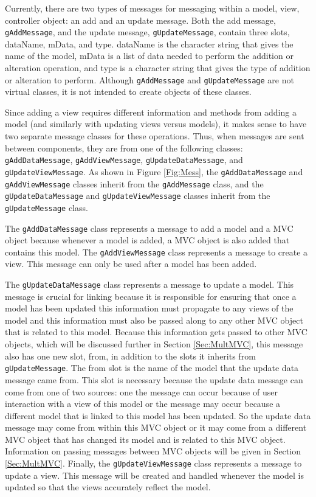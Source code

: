 \documentclass{article}[11pt]
\newcommand{\Robject}[1]{{\texttt{#1}}}
\begin{document}
Currently, there are two types of messages for messaging within a model, view,
controller object: an add and an update message.  Both the add message,
\Robject{gAddMessage}, and the update message, \Robject{gUpdateMessage},
contain three slots, dataName, mData, and type.  dataName is the character
string that gives the name of the model, mData is a list of data needed to
perform the addition or alteration operation, and type is a character string
that gives the type of addition or alteration to perform.  Although
\Robject{gAddMessage} and \Robject{gUpdateMessage} are not virtual classes, it
is not intended to create objects of these classes.

Since adding a view requires different information and methods from adding a
model (and similarly with updating views versus models), it makes sense to
have two separate message classes for these operations.  Thus, when messages
are sent between components, they are from one of the following classes:
\Robject{gAddDataMessage}, \Robject{gAddViewMessage},
\Robject{gUpdateDataMessage}, and \Robject{gUpdateViewMessage}.  As shown in
Figure \ref{Fig:Mess}, the \Robject{gAddDataMessage} and
\Robject{gAddViewMessage} classes inherit from the \Robject{gAddMessage}
class, and the \Robject{gUpdateDataMessage} and \Robject{gUpdateViewMessage}
classes inherit from the \Robject{gUpdateMessage} class. 

The \Robject{gAddDataMessage} class represents a message to add a model and a
MVC object because whenever a model is added, a MVC object is also added that
contains this model.  The \Robject{gAddViewMessage} class represents a message
to create a view.  This message can only be used after a model has been
added.  

The \Robject{gUpdateDataMessage} class represents a message to update
a model.  This message is crucial for linking because it is responsible for
ensuring that once a model has been updated this information must propagate to
any views of the model and this information must also be passed along to any
other MVC object that is related to this model.  Because this information gets
passed to other MVC objects, which will be discussed further in Section
\ref{Sec:MultMVC}, this message also has one new slot, from, in addition to
the slots it inherits from \Robject{gUpdateMessage}.  The from slot is the
name of the model that the update data message came from.  This slot is
necessary because the update data message can come from one of two sources:
one the message can occur because of user interaction with a view
of this model or the message may occur because a different model that is
linked to this model has been updated.  So the update data message may come
from within this MVC object or it may come from a different MVC object that
has changed its model and is related to this MVC object.  
Information on passing messages between MVC
objects will be given in Section \ref{Sec:MultMVC}.  Finally, the
\Robject{gUpdateViewMessage} class represents a message to update a view.
This message will be created and handled whenever the model is updated so that
the views accurately reflect the model.
\end{document}
